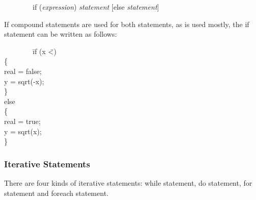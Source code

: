 \documentclass[12pt,psfig,a4]{article}
\begin{document}
\begin{code}
\begin{tabbing}
~~~~~~~~if (\textsl{expression}) \textsl{statement} [else \textsl{statement}]
\end{tabbing}
\end{code}

If compound statements are used for both statements, as is used mostly, the if statement can be written as follows:

\begin{code}
\begin{tabbing}
~~~~~~~~\= if (x \= \textless {}) \\
\> \{ \\
\> \> real = false; \\
\> \> y = sqrt(-x); \\
\> \} \\
\> else \\
\> \{ \\
\> \> real = true; \\
\> \> y = sqrt(x); \\
\> \}
\end{tabbing}
\end{code}

\subsubsection{Iterative Statements}
There are four kinds of iterative statements: while statement, do statement, for statement and foreach statement.
\end{document}

